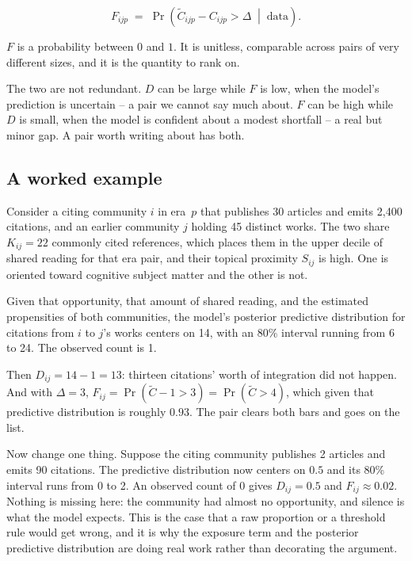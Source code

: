 \documentclass[11pt]{article}
\begin{document}
\begin{equation}
F_{ijp} \;=\; \Pr\!\left(\tilde{C}_{ijp} - C_{ijp} > \Delta \;\middle|\; \text{data}\right).
\end{equation}

$F$ is a probability between $0$ and $1$. It is unitless, comparable across pairs of very
different sizes, and it is the quantity to rank on.

The two are not redundant. $D$ can be large while $F$ is low, when the model's prediction is
uncertain -- a pair we cannot say much about. $F$ can be high while $D$ is small, when the
model is confident about a modest shortfall -- a real but minor gap. A pair worth writing
about has both.

\subsection{A worked example}

Consider a citing community $i$ in era~$p$ that publishes 30 articles and emits 2{,}400
citations, and an earlier community $j$ holding 45 distinct works. The two share
$K_{ij} = 22$ commonly cited references, which places them in the upper decile of shared
reading for that era pair, and their topical proximity $S_{ij}$ is high. One is oriented
toward cognitive subject matter and the other is not.

Given that opportunity, that amount of shared reading, and the estimated propensities of both
communities, the model's posterior predictive distribution for citations from $i$ to $j$'s
works centers on 14, with an 80\% interval running from 6 to 24. The observed count is 1.

Then $D_{ij} = 14 - 1 = 13$: thirteen citations' worth of integration did not happen. And
with $\Delta = 3$, $F_{ij} = \Pr(\tilde{C} - 1 > 3) = \Pr(\tilde{C} > 4)$, which given that
predictive distribution is roughly $0.93$. The pair clears both bars and goes on the list.

Now change one thing. Suppose the citing community publishes 2 articles and emits 90
citations. The predictive distribution now centers on $0.5$ and its 80\% interval runs from 0
to 2. An observed count of 0 gives $D_{ij} = 0.5$ and $F_{ij} \approx 0.02$. Nothing is
missing here: the community had almost no opportunity, and silence is what the model expects.
This is the case that a raw proportion or a threshold rule would get wrong, and it is why the
exposure term and the posterior predictive distribution are doing real work rather than
decorating the argument.
\end{document}

